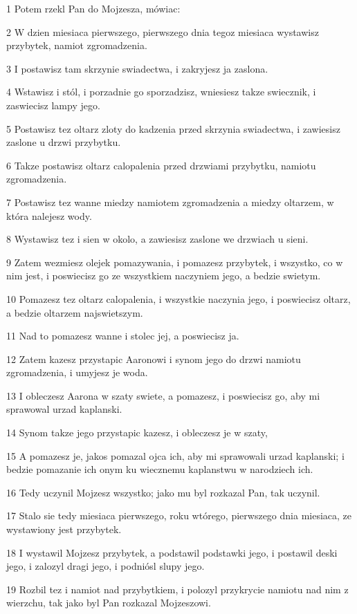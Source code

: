 \par 1 Potem rzekl Pan do Mojzesza, mówiac:
\par 2 W dzien miesiaca pierwszego, pierwszego dnia tegoz miesiaca wystawisz przybytek, namiot zgromadzenia.
\par 3 I postawisz tam skrzynie swiadectwa, i zakryjesz ja zaslona.
\par 4 Wstawisz i stól, i porzadnie go sporzadzisz, wniesiesz takze swiecznik, i zaswiecisz lampy jego.
\par 5 Postawisz tez oltarz zloty do kadzenia przed skrzynia swiadectwa, i zawiesisz zaslone u drzwi przybytku.
\par 6 Takze postawisz oltarz calopalenia przed drzwiami przybytku, namiotu zgromadzenia.
\par 7 Postawisz tez wanne miedzy namiotem zgromadzenia a miedzy oltarzem, w która nalejesz wody.
\par 8 Wystawisz tez i sien w okolo, a zawiesisz zaslone we drzwiach u sieni.
\par 9 Zatem wezmiesz olejek pomazywania, i pomazesz przybytek, i wszystko, co w nim jest, i poswiecisz go ze wszystkiem naczyniem jego, a bedzie swietym.
\par 10 Pomazesz tez oltarz calopalenia, i wszystkie naczynia jego, i poswiecisz oltarz, a bedzie oltarzem najswietszym.
\par 11 Nad to pomazesz wanne i stolec jej, a poswiecisz ja.
\par 12 Zatem kazesz przystapic Aaronowi i synom jego do drzwi namiotu zgromadzenia, i umyjesz je woda.
\par 13 I obleczesz Aarona w szaty swiete, a pomazesz, i poswiecisz go, aby mi sprawowal urzad kaplanski.
\par 14 Synom takze jego przystapic kazesz, i obleczesz je w szaty,
\par 15 A pomazesz je, jakos pomazal ojca ich, aby mi sprawowali urzad kaplanski; i bedzie pomazanie ich onym ku wiecznemu kaplanstwu w narodziech ich.
\par 16 Tedy uczynil Mojzesz wszystko; jako mu byl rozkazal Pan, tak uczynil.
\par 17 Stalo sie tedy miesiaca pierwszego, roku wtórego, pierwszego dnia miesiaca, ze wystawiony jest przybytek.
\par 18 I wystawil Mojzesz przybytek, a podstawil podstawki jego, i postawil deski jego, i zalozyl dragi jego, i podniósl slupy jego.
\par 19 Rozbil tez i namiot nad przybytkiem, i polozyl przykrycie namiotu nad nim z wierzchu, tak jako byl Pan rozkazal Mojzeszowi.
